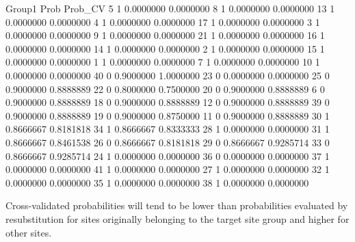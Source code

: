 \documentclass[11pt,a4paper]{article}
\begin{document}
\begin{Schunk}
\begin{Soutput}
   Group1      Prob   Prob_CV
5       1 0.0000000 0.0000000
8       1 0.0000000 0.0000000
13      1 0.0000000 0.0000000
4       1 0.0000000 0.0000000
17      1 0.0000000 0.0000000
3       1 0.0000000 0.0000000
9       1 0.0000000 0.0000000
21      1 0.0000000 0.0000000
16      1 0.0000000 0.0000000
14      1 0.0000000 0.0000000
2       1 0.0000000 0.0000000
15      1 0.0000000 0.0000000
1       1 0.0000000 0.0000000
7       1 0.0000000 0.0000000
10      1 0.0000000 0.0000000
40      0 0.9000000 1.0000000
23      0 0.0000000 0.0000000
25      0 0.9000000 0.8888889
22      0 0.8000000 0.7500000
20      0 0.9000000 0.8888889
6       0 0.9000000 0.8888889
18      0 0.9000000 0.8888889
12      0 0.9000000 0.8888889
39      0 0.9000000 0.8888889
19      0 0.9000000 0.8750000
11      0 0.9000000 0.8888889
30      1 0.8666667 0.8181818
34      1 0.8666667 0.8333333
28      1 0.0000000 0.0000000
31      1 0.8666667 0.8461538
26      0 0.8666667 0.8181818
29      0 0.8666667 0.9285714
33      0 0.8666667 0.9285714
24      1 0.0000000 0.0000000
36      0 0.0000000 0.0000000
37      1 0.0000000 0.0000000
41      1 0.0000000 0.0000000
27      1 0.0000000 0.0000000
32      1 0.0000000 0.0000000
35      1 0.0000000 0.0000000
38      1 0.0000000 0.0000000
\end{Soutput}
\end{Schunk}
Cross-validated probabilities will tend to be lower than probabilities evaluated by resubstitution for sites originally belonging to the target site group and higher for other sites.


\end{document}
